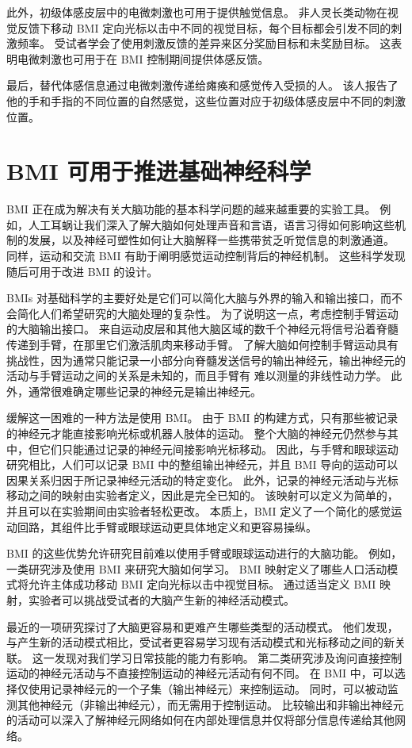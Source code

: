 此外，初级体感皮层中的电微刺激也可用于提供触觉信息。 
非人灵长类动物在视觉反馈下移动 BMI 定向光标以击中不同的视觉目标，每个目标都会引发不同的刺激频率。 
受试者学会了使用刺激反馈的差异来区分奖励目标和未奖励目标。 这表明电微刺激也可用于在 BMI 控制期间提供体感反馈。


最后，替代体感信息通过电微刺激传递给瘫痪和感觉传入受损的人。 
该人报告了他的手和手指的不同位置的自然感觉，这些位置对应于初级体感皮层中不同的刺激位置。


\section{BMI 可用于推进基础神经科学}

BMI 正在成为解决有关大脑功能的基本科学问题的越来越重要的实验工具。 
例如，人工耳蜗让我们深入了解大脑如何处理声音和言语，语言习得如何影响这些机制的发展，以及神经可塑性如何让大脑解释一些携带贫乏听觉信息的刺激通道。 
同样，运动和交流 BMI 有助于阐明感觉运动控制背后的神经机制。 
这些科学发现随后可用于改进 BMI 的设计。


BMIs 对基础科学的主要好处是它们可以简化大脑与外界的输入和输出接口，而不会简化人们希望研究的大脑处理的复杂性。 
为了说明这一点，考虑控制手臂运动的大脑输出接口。 
来自运动皮层和其他大脑区域的数千个神经元将信号沿着脊髓传递到手臂，在那里它们激活肌肉来移动手臂。 
了解大脑如何控制手臂运动具有挑战性，因为通常只能记录一小部分向脊髓发送信号的输出神经元，输出神经元的活动与手臂运动之间的关系是未知的，而且手臂有 难以测量的非线性动力学。 
此外，通常很难确定哪些记录的神经元是输出神经元。


缓解这一困难的一种方法是使用 BMI。 
由于 BMI 的构建方式，只有那些被记录的神经元才能直接影响光标或机器人肢体的运动。 
整个大脑的神经元仍然参与其中，但它们只能通过记录的神经元间接影响光标移动。 
因此，与手臂和眼球运动研究相比，人们可以记录 BMI 中的整组输出神经元，并且 BMI 导向的运动可以因果关系归因于所记录神经元活动的特定变化。 
此外，记录的神经元活动与光标移动之间的映射由实验者定义，因此是完全已知的。 该映射可以定义为简单的，并且可以在实验期间由实验者轻松更改。 
本质上，BMI 定义了一个简化的感觉运动回路，其组件比手臂或眼球运动更具体地定义和更容易操纵。


BMI 的这些优势允许研究目前难以使用手臂或眼球运动进行的大脑功能。 
例如，一类研究涉及使用 BMI 来研究大脑如何学习。 
BMI 映射定义了哪些人口活动模式将允许主体成功移动 BMI 定向光标以击中视觉目标。 
通过适当定义 BMI 映射，实验者可以挑战受试者的大脑产生新的神经活动模式。


最近的一项研究探讨了大脑更容易和更难产生哪些类型的活动模式。 
他们发现，与产生新的活动模式相比，受试者更容易学习现有活动模式和光标移动之间的新关联。 
这一发现对我们学习日常技能的能力有影响。 
第二类研究涉及询问直接控制运动的神经元活动与不直接控制运动的神经元活动有何不同。 
在 BMI 中，可以选择仅使用记录神经元的一个子集（输出神经元）来控制运动。 
同时，可以被动监测其他神经元（非输出神经元），而无需用于控制运动。 
比较输出和非输出神经元的活动可以深入了解神经元网络如何在内部处理信息并仅将部分信息传递给其他网络。


